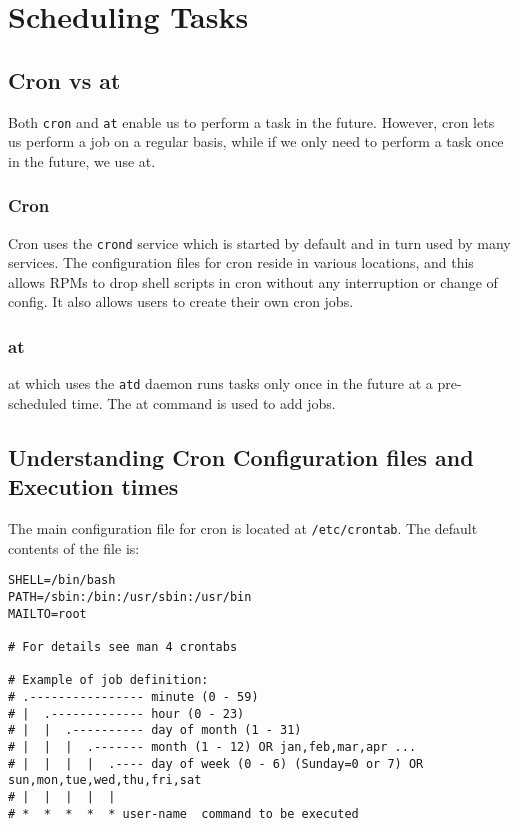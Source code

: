 \chapter{Scheduling Tasks}

\section{Cron vs at}
Both \verb|cron| and \verb|at| enable us to perform a task in the future. However, cron lets us perform a job on a regular basis, while if we only need to perform a task once in the future, we use at. 

\subsection{Cron}
Cron uses the \verb|crond| service which is started by default and in turn used by many services. The configuration files for cron reside in various locations, and this allows RPMs to drop shell scripts in cron without any interruption or change of config. It also allows users to create their own cron jobs. 

\subsection{at}
at which uses the \verb|atd| daemon runs tasks only once in the future at a pre-scheduled time. The at command is used to add jobs.

	\section{Understanding Cron Configuration files and Execution times} 
The main configuration file for cron is located at \verb|/etc/crontab|. The default contents of the file is:

\vspace{-15pt}
\begin{verbatim}
SHELL=/bin/bash
PATH=/sbin:/bin:/usr/sbin:/usr/bin
MAILTO=root

# For details see man 4 crontabs

# Example of job definition:
# .---------------- minute (0 - 59)
# |  .------------- hour (0 - 23)
# |  |  .---------- day of month (1 - 31)
# |  |  |  .------- month (1 - 12) OR jan,feb,mar,apr ...
# |  |  |  |  .---- day of week (0 - 6) (Sunday=0 or 7) OR sun,mon,tue,wed,thu,fri,sat
# |  |  |  |  |
# *  *  *  *  * user-name  command to be executed
\end{verbatim}
\vspace{-10pt}

